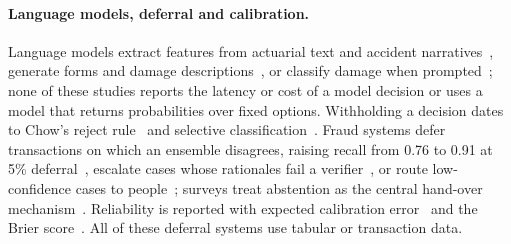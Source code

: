 \paragraph{Language models, deferral and calibration.}
Language models extract features from actuarial text and accident narratives~\cite{hatzesberger2026,hao2026traffic,chen2026bus}, generate forms and damage descriptions~\cite{arconzo2026,phuengpanyaloet2026}, or classify damage when prompted~\cite{mitrenga2026}; none of these studies reports the latency or cost of a model decision or uses a model that returns probabilities over fixed options. Withholding a decision dates to Chow's reject rule~\cite{chow1970} and selective classification~\cite{geifman2017selective}. Fraud systems defer transactions on which an ensemble disagrees, raising recall from 0.76 to 0.91 at 5\% deferral~\cite{liu2026daunt}, escalate cases whose rationales fail a verifier~\cite{sourav2026}, or route low-confidence cases to people~\cite{syed2026,dadi2026}; surveys treat abstention as the central hand-over mechanism~\cite{lazaros2026,punzi2026,presacan2026}. Reliability is reported with expected calibration error~\cite{naeini2015,guo2017calibration} and the Brier score~\cite{brier1950}. All of these deferral systems use tabular or transaction data.

